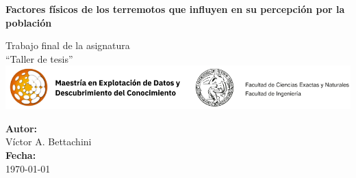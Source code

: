 \documentclass[a4paper]{report}
\begin{document}
%


\begin{titlepage}
    \centering
    
    \huge\textbf{Factores físicos de los terremotos que influyen en su percepción por la población}
    
    \vspace{0.5in}
		Trabajo final de la asignatura\\``Taller de tesis''\\
    \vspace{0.5in}
		\includegraphics[width=\textwidth]{logos}\\
    \vspace{0.5in}
    
    \large
    \textbf{Autor:}\\
		Víctor A. Bettachini\\
    \vspace{0.5in}
    \textbf{Fecha:}\\
    \today
    
    \vfill
    \begin{minipage}{0.8\textwidth}
    \begin{abstract}
        Una decena de terremotos se producen en el territorio nacional en forma diaria sin que sean detectados más que por instrumentos. Son muy pocos los casos en que las ondas sismicas que estos producen son percibidos por la población. Este trabajo examina busca determinar la importancia relativa de los descriptores físicos de terremotos que más contribuyen a que sean percibidos por las personas. 
    \end{abstract}
		\end{minipage}
	\end{titlepage}
\end{document}
